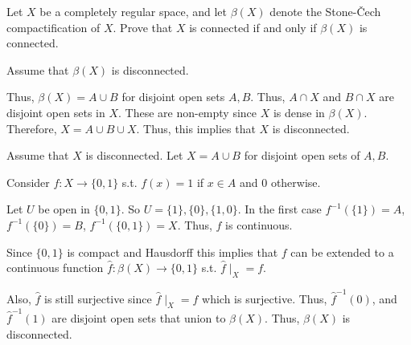 \documentclass[12pt, letterpaper]{article}
\begin{document}
\begin{problem}{}
  Let $X$ be a completely regular space, and let $\beta(X)$ denote the
  Stone-\v{C}ech compactification of $X$. Prove that $X$ is connected
  if and only if $\beta(X)$ is connected.
\end{problem}
\begin{problemproof}
  Assume that $\beta(X)$ is disconnected.

  Thus, $\beta(X)=A \cup B$ for disjoint open sets $A,B$. Thus, $A \cap X$ and $B \cap X$ are disjoint open sets in $X$. These are non-empty since $X$ is dense in $\beta(X)$. Therefore,
  $X=A \cup B \cup X$. Thus, this implies that $X$ is disconnected.

  Assume that $X$ is disconnected. Let $X=A \cup B$ for disjoint open sets of $A,B$.

  Consider $f: X \to \{0,1\}$ s.t. $f(x)=1$ if $x \in A$ and 0 otherwise.

  Let $U$ be open in $\{0,1\}$. So $U=\{1\},\{0\},\{1,0\}$. In the first case $f^{-1}(\{1\})=A$, $f^{-1}(\{0\})=B$, $f^{-1}(\{0,1\})=X$. Thus, $f$ is continuous.

  Since $\{0,1\}$ is compact and Hausdorff this implies that $f$ can be extended to a continuous function $\hat{f} : \beta(X) \to \{0,1\}$ s.t. $\hat{f} \mid_X = f$.

  Also, $\hat{f}$ is still surjective since $\hat{f}\mid_X=f$ which is surjective. Thus, $\hat{f}^{-1}(0)$, and $\hat{f}^{-1}(1)$ are disjoint open sets that union to $\beta(X)$. Thus, $\beta(X)$ is disconnected.
\end{problemproof}
\end{document}
